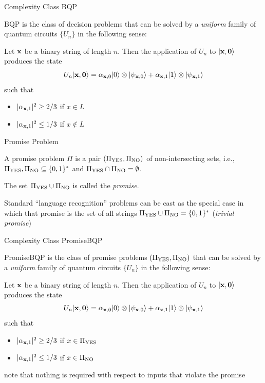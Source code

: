 \documentclass[slideColor]{prosper}
\renewcommand{\>}{\rangle}
\newcommand{\<}{\langle}
\begin{document}
\begin{slide}{Complexity Class BQP}

BQP is the class of decision problems that can be solved by a {\em uniform} family of quantum circuits $\{U_n\}$ in the following sense:

\bigskip
Let ${\bf x}$ be a binary string of length $n$. Then the application of $U_n$ to $|{\bf x},{\bf 0}\>$ produces the state
\[
U_n |{\bf x},{\bf 0}\> = \alpha_{{\bf x},0}|0\> \otimes |\psi_{{\bf x},0}\> + \alpha_{{\bf x},1}|1\> \otimes |\psi_{{\bf x},1}\>
\]
such that 
\begin{itemize}
\item $|\alpha_{{\bf x},1}|^2\ge 2/3$ if $x\in L$
\item $|\alpha_{{\bf x},1}|^2\le 1/3$ if $x\not\in L$
\end{itemize}

\end{slide}


\begin{slide}{Promise Problem}

A promise problem $\Pi$ is a pair $(\Pi_{\rm YES},\Pi_{\rm NO})$ of non-intersecting sets, i.e., 
$\Pi_{\rm YES},\Pi_{\rm NO}\subseteq\{0,1\}^*$ and $\Pi_{\rm YES}\cap\Pi_{\rm NO}=\emptyset$.

\bigskip
The set $\Pi_{\rm YES}\cup\Pi_{\rm NO}$ is called the {\em promise}.

\bigskip
Standard ``language recognition'' problems can be cast as the special case in which that promise is the set of all strings $\Pi_{\rm YES}\cup\Pi_{\rm NO}=\{0,1\}^*$ ({\em trivial promise})

\end{slide}


\begin{slide}{Complexity Class PromiseBQP}

PromiseBQP is the class of promise problems $(\Pi_{\rm YES},\Pi_{\rm NO})$ that can be solved by a {\em uniform} family of quantum circuits $\{U_n\}$ in the following sense:

\bigskip
Let ${\bf x}$ be a binary string of length $n$. Then the application of $U_n$ to $|{\bf x},{\bf 0}\>$ produces the state
\[
U_n |{\bf x},{\bf 0}\> = \alpha_{{\bf x},0}|0\> \otimes |\psi_{{\bf x},0}\> + \alpha_{{\bf x},1}|1\> \otimes |\psi_{{\bf x},1}\>
\]
such that 
\begin{itemize}
\item $|\alpha_{{\bf x},1}|^2\ge 2/3$ if $x\in\Pi_{\rm YES}$
\item $|\alpha_{{\bf x},1}|^2\le 1/3$ if $x\in\Pi_{\rm NO}$
\end{itemize}

note that nothing is required with respect to inputs that violate the promise
\end{slide}
\end{document}
